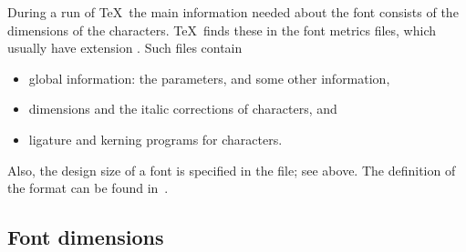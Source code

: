 \documentclass{book}
\begin{document}
During a run of \TeX\ the main information needed about the
%
font consists of the dimensions of the characters.
\TeX\ finds these in the font metrics files, which usually have
extension . Such files
contain \begin{itemize} \item global information: the 
parameters, and some other information,
\item dimensions and the italic corrections of characters, and
\altt
\item ligature and kerning programs for characters.
	\end{itemize}
Also, the design size of a font is specified in the  file;
see above. The definition of the  format can be found
in~\cite{Knuth:TeXprogram}.

\subsection{Font dimensions}
\label{font:dims}
\end{document}
